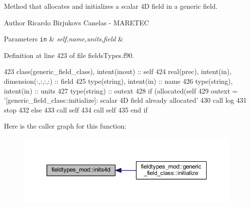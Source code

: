 Method that allocates and initializes a scalar 4D field in a generic field. 

\begin{DoxyAuthor}{Author}
Ricardo Birjukovs Canelas -\/ M\+A\+R\+E\+T\+EC 
\end{DoxyAuthor}

\begin{DoxyParams}[1]{Parameters}
\mbox{\tt in}  & {\em self,name,units,field} & \\
\hline
\end{DoxyParams}


Definition at line 423 of file fields\+Types.\+f90.


\begin{DoxyCode}
423     \textcolor{keywordtype}{class}(generic\_field\_class), \textcolor{keywordtype}{intent(inout)} :: self
424     \textcolor{keywordtype}{real(prec)}, \textcolor{keywordtype}{intent(in)}, \textcolor{keywordtype}{dimension(:,:,:,:)} :: field
425     \textcolor{keywordtype}{type}(string), \textcolor{keywordtype}{intent(in)} :: name
426     \textcolor{keywordtype}{type}(string), \textcolor{keywordtype}{intent(in)} :: units
427     \textcolor{keywordtype}{type}(string) :: outext
428     \textcolor{keywordflow}{if} (\textcolor{keyword}{allocated}(self%
429         outext = \textcolor{stringliteral}{'[generic\_field\_class::initialize]: scalar 4D field already allocated'}
430         \textcolor{keyword}{call }log%
431         stop
432     \textcolor{keywordflow}{else}
433         \textcolor{keyword}{call }self%
434         \textcolor{keyword}{call }self%
435 \textcolor{keywordflow}{    end if}
\end{DoxyCode}
Here is the caller graph for this function\+:\nopagebreak
\begin{figure}[H]
\begin{center}
\leavevmode
\includegraphics[width=350pt]{namespacefieldtypes__mod_a1987bd94293cfd9e35016ac5992501cd_icgraph}
\end{center}
\end{figure}
\mbox{\label{namespacefieldtypes__mod_a96ff5318da6a7db8bb61c525315c1c89}} 
